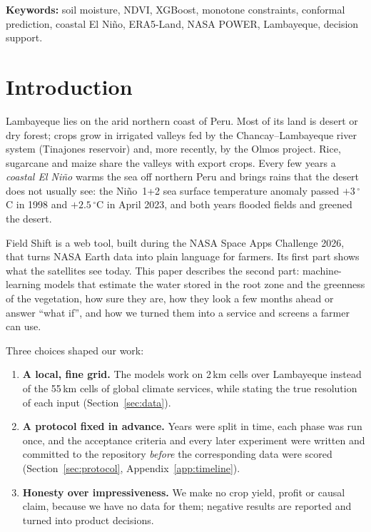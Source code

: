 \documentclass[11pt,a4paper]{article}
\begin{document}
\noindent\textbf{Keywords:} soil moisture, NDVI, XGBoost, monotone constraints, conformal prediction, coastal El Ni\~no, ERA5-Land, NASA POWER, Lambayeque, decision support.

\section{Introduction}

Lambayeque lies on the arid northern coast of Peru. Most of its land is desert or dry forest; crops grow in irrigated
valleys fed by the Chancay--Lambayeque river system (Tinajones reservoir) and, more recently, by the Olmos project.
Rice, sugarcane and maize share the valleys with export crops. Every few years a \emph{coastal El Ni\~no} warms the
sea off northern Peru and brings rains that the desert does not usually see: the Ni\~no~1+2 sea surface temperature
anomaly passed $+3\,^\circ$C in 1998 and $+2.5\,^\circ$C in April 2023, and both years flooded fields and greened the
desert.

Field Shift is a web tool, built during the NASA Space Apps Challenge 2026, that turns NASA Earth data into plain language
for farmers. Its first part shows what the satellites see today. This paper describes the second part: machine-learning
models that estimate the water stored in the root zone and the greenness of the vegetation, how sure they are, how they
look a few months ahead or answer ``what if'', and how we turned them into a service and screens a farmer can use.

Three choices shaped our work:
\begin{enumerate}
\item \textbf{A local, fine grid.} The models work on 2\,km cells over Lambayeque instead of the 55\,km cells of
global climate services, while stating the true resolution of each input (Section~\ref{sec:data}).
\item \textbf{A protocol fixed in advance.} Years were split in time, each phase was run once, and the acceptance
criteria and every later experiment were written and committed to the repository \emph{before} the corresponding data
were scored (Section~\ref{sec:protocol}, Appendix~\ref{app:timeline}).
\item \textbf{Honesty over impressiveness.} We make no crop yield, profit or causal claim, because we have no data for
them; negative results are reported and turned into product decisions.
\end{enumerate}
\end{document}
